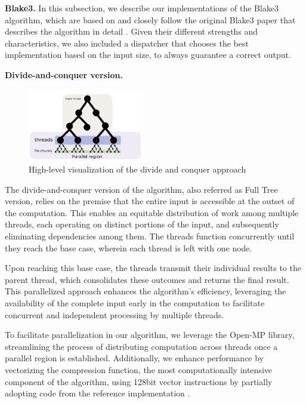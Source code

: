 \documentclass[letterpaper]{article}
\newcommand{\mypar}[1]{{\bf #1.}}
\begin{document}
\mypar{Blake3}
In this subsection, we describe our implementations of the Blake3 algorithm, which are based on and closely follow the original Blake3 paper that describes the algorithm in detail \cite{blake}.
Given their different strengths and characteristics, we also included a dispatcher that chooses the best implementation based on the input size, to always guarantee a correct output.

\mypar{Divide-and-conquer version}
\begin{figure}[h]
	\begin{center}
		\includegraphics[width=0.45\textwidth]{figures/div_conq.png}
	\end{center}
	\caption{High-level visualization of the divide and conquer approach}\label{fig:divide_and_conquer}
\end{figure}
The divide-and-conquer version of the algorithm, also referred as Full Tree version, relies on the premise that the entire input is accessible at the outset of the computation. This enables an equitable distribution of work among multiple threads, each operating on distinct portions of the input, and subsequently eliminating dependencies among them. The threads function concurrently until they reach the base case, wherein each thread is left with one node.

Upon reaching this base case, the threads transmit their individual results to the parent thread, which consolidates these outcomes and returns the final result. This parallelized approach enhances the algorithm's efficiency, leveraging the availability of the complete input early in the computation to facilitate concurrent and independent processing by multiple threads.

To facilitate parallelization in our algorithm, we leverage the Open-MP library, streamlining the process of distributing computation across threads once a parallel region is established. Additionally, we enhance performance by vectorizing the compression function, the most computationally intensive component of the algorithm, using 128bit vector instructions by partially adopting code from the reference implementation \cite{gitblake}.
\end{document}

